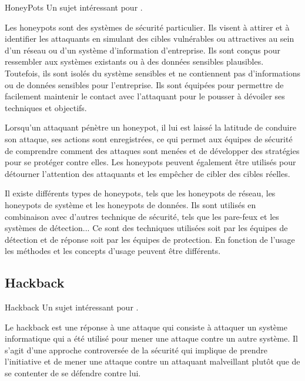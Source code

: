 \begin{techworkbox}{HoneyPots}
Un sujet intéressant pour \fichetech. 
\end{techworkbox}

Les honeypots sont des systèmes de sécurité particulier. Ils visent à attirer et à identifier les attaquants  en simulant des cibles vulnérables ou attractives au sein d'un réseau ou d'un système d'information d'entreprise. Ils sont conçus pour ressembler aux systèmes existants ou à des données sensibles plausibles. Toutefois, ils sont isolés du système sensibles et ne contiennent pas d'informations ou de données sensibles pour l'entreprise. Ils sont équipées pour permettre de facilement maintenir le contact avec l'attaquant pour le pousser à dévoiler ses techniques et objectifs.

Lorsqu'un attaquant pénètre un honeypot, il lui est laissé la latitude de conduire son attaque, ses actions sont enregistrées, ce qui permet aux équipes de sécurité de comprendre comment des attaques sont menées et de développer des stratégies pour se protéger contre elles. Les honeypots peuvent également être utilisés pour détourner l'attention des attaquants et les empêcher de cibler des cibles réelles.

Il existe différents types de honeypots, tels que les honeypots de réseau, les honeypots de système et les honeypots de données. Ils sont utilisés en combinaison avec d'autres technique de sécurité, tels que les pare-feux et les systèmes de détection...
Ce sont des techniques utilisées soit par les équipes de détection et de réponse soit par les équipes de protection. En fonction de l'usage les méthodes et les concepts d'usage peuvent être différents.


\subsection{Hackback}

\begin{techworkbox}{Hackback}
Un sujet intéressant pour \fichetech. 
\end{techworkbox}

Le hackback est une réponse à une attaque qui consiste à attaquer un système informatique qui a été utilisé pour mener une attaque contre un autre système. Il s'agit d'une approche controversée de la sécurité qui implique de prendre l'initiative et de mener une attaque contre un attaquant malveillant plutôt que de se contenter de se défendre contre lui.

